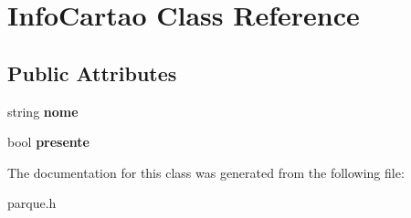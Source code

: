 \hypertarget{classInfoCartao}{}\section{Info\+Cartao Class Reference}
\label{classInfoCartao}
\subsection*{Public Attributes}
\begin{DoxyCompactItemize}
\item 
\mbox{\label{classInfoCartao_ac921f2dbd6d60d22e1fd960ad4cf52c0}} 
string {\bfseries nome}
\item 
\mbox{\label{classInfoCartao_a52875cb735d23bbc5f169f3888ad5fb1}} 
bool {\bfseries presente}
\end{DoxyCompactItemize}


The documentation for this class was generated from the following file\+:\begin{DoxyCompactItemize}
\item 
parque.\+h\end{DoxyCompactItemize}
